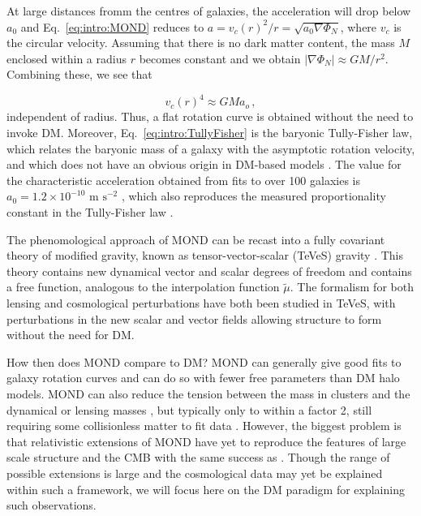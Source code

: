At large distances fromm the centres of galaxies, the acceleration will drop below $a_0$ and Eq.~\ref{eq:intro:MOND} reduces to $a = v_c(r)^2/r = \sqrt{a_0 \nabla \Phi_N}$, where $v_c$ is the circular velocity. Assuming that there is no dark matter content, the mass $M$ enclosed within a radius $r$ becomes constant and we obtain $|\nabla \Phi_N| \approx GM/r^2$. Combining these, we see that

\begin{equation}
\label{eq:intro:TullyFisher}
v_c(r)^4 \approx GM a_o\,,
\end{equation}
independent of radius. Thus, a flat rotation curve is obtained without the need to invoke DM. Moreover, Eq.~\ref{eq:intro:TullyFisher} is the baryonic Tully-Fisher law, which relates the baryonic mass of a galaxy with the asymptotic rotation velocity, and which does not have an obvious origin in DM-based models \cite{Gnedin:2007}. The value for the characteristic acceleration obtained from fits to over 100 galaxies is $a_0 = 1.2 \times 10^{-10} \textrm{ m s}^{-2}$ \cite{Begeman:1991}, which also reproduces the measured proportionality constant in the Tully-Fisher law \cite{McGaugh:2005}.

The phenomological approach of MOND can be recast into a fully covariant theory of modified gravity, known as tensor-vector-scalar (TeVeS) gravity \cite{Bekenstein:2005}. This theory contains new dynamical vector and scalar degrees of freedom and contains a free function, analogous to the interpolation function $\tilde{\mu}$. The formalism for both lensing \cite{Chiu:2005} and cosmological perturbations \cite{Skordis:2006} have both been studied in TeVeS, with perturbations in the new scalar and vector fields allowing structure to form without the need for DM.

How then does MOND compare to DM? MOND can generally give good fits to galaxy rotation curves \cite{Begeman:1991,Sanders:1996,deBlok:1998} and can do so with fewer free parameters than DM halo models. MOND can also reduce the tension between the mass in clusters and the dynamical or lensing masses \cite{Sanders:2002,Angus:2006}, but typically only to within a factor 2, still requiring some collisionless matter to fit data \cite{Dodelson:2006}. However, the biggest problem is that relativistic extensions of MOND have yet to reproduce the features of large scale structure and the CMB with the same success as \LCDM \cite{Slosar:2005,Skordis:2006b,Zuntz:2010}. Though the range of possible extensions is large and the cosmological data may yet be explained within such a framework, we will focus here on the DM paradigm for explaining such observations.

